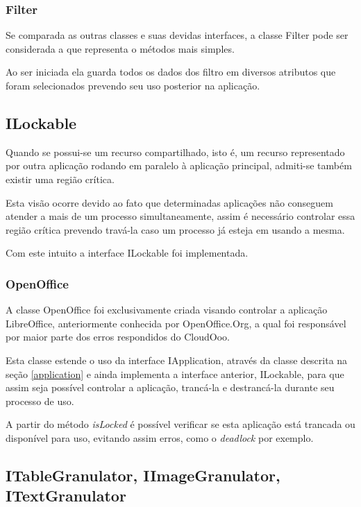 \subsubsection{Filter}

Se comparada as outras classes e suas devidas interfaces, a classe Filter pode ser considerada a que representa o métodos mais simples.

Ao ser iniciada ela guarda todos os dados dos filtro em diversos atributos que foram selecionados prevendo seu uso posterior na aplicação.


\subsection{ILockable}

Quando se possui-se um recurso compartilhado, isto é, um recurso representado por outra aplicação rodando em paralelo à aplicação principal, admiti-se também existir uma região crítica.

Esta visão ocorre devido ao fato que determinadas aplicações não conseguem atender a mais de um processo simultaneamente, assim é necessário controlar essa região crítica prevendo travá-la caso um processo já esteja em usando a mesma.

Com este intuito a interface ILockable foi implementada.


\subsubsection{OpenOffice}

A classe OpenOffice foi exclusivamente criada visando controlar a aplicação LibreOffice, anteriormente conhecida por OpenOffice.Org, a qual foi responsável por maior parte dos erros respondidos do CloudOoo. 

Esta classe estende o uso da interface IApplication, através da classe descrita na seção \ref{application} e ainda implementa a interface anterior, ILockable, para que assim seja possível controlar a aplicação, trancá-la e destrancá-la durante seu processo de uso.

A partir do método \textit{isLocked} é possível verificar se esta aplicação está trancada ou disponível para uso, evitando assim erros, como o \textit{deadlock} por exemplo.


\subsection{ITableGranulator, IImageGranulator, ITextGranulator}

